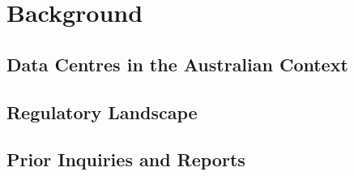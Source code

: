 \chapter{Background}
\label{ch:background}


\section{Data Centres in the Australian Context}
\label{sec:background:context}

\lipsum[1-2]

\section{Regulatory Landscape}
\label{sec:background:regulation}

\lipsum[3]

\section{Prior Inquiries and Reports}
\label{sec:background:prior}

\lipsum[4]
